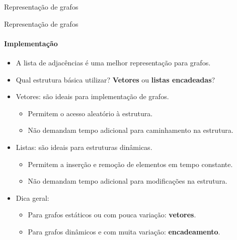 \begin{frame}[t]{Representação de grafos}
{
	}
\end{frame}



\begin{frame}{Representação de grafos}
	\framesubtitle{Implementação}

	\begin{itemize}
		\item A lista de adjacências é uma melhor representação para grafos.
		\item Qual estrutura básica utilizar? \textbf{Vetores} ou \textbf{listas encadeadas}?
		
		\item {\color{magenta}Vetores:} são ideais para implementação de grafos.
		\begin{itemize}
			\item Permitem o acesso aleatório à estrutura.
			\item Não demandam tempo adicional para caminhamento na estrutura.
		\end{itemize}
	
		\item {\color{magenta}Listas:} são ideais para estruturas dinâmicas.
		\begin{itemize}
			\item Permitem a inserção e remoção de elementos em tempo constante.
			\item Não demandam tempo adicional para modificações na estrutura.
		\end{itemize}
	
		\item {\color{magenta}Dica geral:}
		\begin{itemize}
			\item Para grafos estáticos ou com pouca variação: \textbf{vetores}.
			\item Para grafos dinâmicos e com muita variação: \textbf{encadeamento}.
		\end{itemize}
	\end{itemize}
\end{frame}



